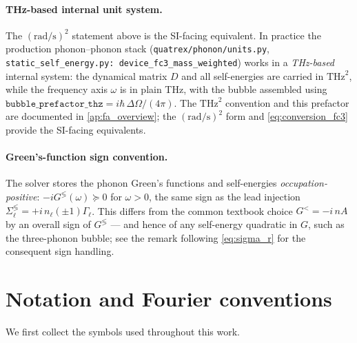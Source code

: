 \paragraph{THz-based internal unit system.}
The $(\mathrm{rad/s})^2$ statement above is the SI-facing equivalent.  In
practice the production phonon--phonon stack
(\texttt{quatrex/phonon/units.py},
\texttt{static\_self\_energy.py:\,device\_fc3\_mass\_weighted}) works in a
\emph{THz-based} internal system: the dynamical matrix $D$ and all
self-energies are carried in $\mathrm{THz}^2$, while the frequency axis
$\omega$ is in plain THz, with the bubble assembled using
$\texttt{bubble\_prefactor\_thz} = i\hbar\,\Delta\Omega/(4\pi)$.  The
$\mathrm{THz}^2$ convention and this prefactor are documented in
\cref{ap:fa_overview}; the $(\mathrm{rad/s})^2$ form and
\cref{eq:conversion_fc3} provide the SI-facing equivalents.

\paragraph{Green's-function sign convention.}
The solver stores the phonon Green's functions and self-energies
\emph{occupation-positive}: $-iG^{\lessgtr}(\omega)\succeq0$ for $\omega>0$, the
same sign as the lead injection
$\Sigma_\ell^{\lessgtr}=+i\,n_\ell(\pm1)\Gamma_\ell$. This differs from the
common textbook choice $G^<=-i\,nA$ by an overall sign of $G^{\lessgtr}$ --- and
hence of any self-energy quadratic in $G$, such as the three-phonon bubble; see
the remark following \cref{eq:sigma_r} for the consequent sign handling.

\section{Notation and Fourier conventions}
\label{sec:notation_fourier}

We first collect the symbols used throughout this work.

